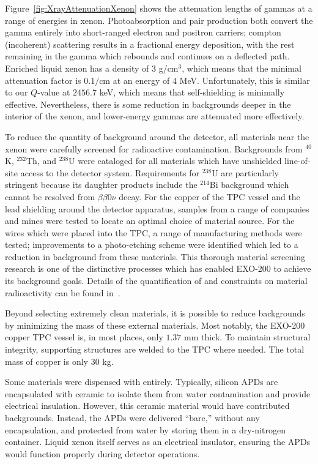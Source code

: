 Figure~\ref{fig:XrayAttenuationXenon} shows the attenuation lengths of gammas at a range of energies in xenon.  Photoabsorption and pair production both convert the gamma entirely into short-ranged electron and positron carriers; compton (incoherent) scattering results in a fractional energy deposition, with the rest remaining in the gamma which rebounds and continues on a deflected path.  Enriched liquid xenon has a density of $3$ g/cm$^3$, which means that the minimal attenuation factor is $0.1/\text{cm}$ at an energy of $4$ MeV.  Unfortunately, this is similar to our $Q$-value at $2456.7$ keV, which means that self-shielding is minimally effective.  Nevertheless, there is some reduction in backgrounds deeper in the interior of the xenon, and lower-energy gammas are attenuated more effectively.~\cite{XcomXenonAttenuation}

To reduce the quantity of background around the detector, all materials near the xenon were carefully screened for radioactive contamination.  Backgrounds from $^{40}$K, $^{232}$Th, and $^{238}$U were cataloged for all materials which have unshielded line-of-site access to the detector system.  Requirements for $^{238}$U are particularly stringent because its daughter products include the $^{214}$Bi background which cannot be resolved from $\beta\beta 0\nu$ decay.  For the copper of the TPC vessel and the lead shielding around the detector apparatus, samples from a range of companies and mines were tested to locate an optimal choice of material source.  For the wires which were placed into the TPC, a range of manufacturing methods were tested; improvements to a photo-etching scheme were identified which led to a reduction in background from these materials.  This thorough material screening research is one of the distinctive processes which has enabled EXO-200 to achieve its background goals.  Details of the quantification of and constraints on material radioactivity can be found in~\cite{MaterialsCatalog}.

Beyond selecting extremely clean materials, it is possible to reduce backgrounds by minimizing the mass of these external materials.  Most notably, the EXO-200 copper TPC vessel is, in most places, only $1.37$ mm thick. To maintain structural integrity, supporting structures are welded to the TPC where needed. The total mass of copper is only $30$ kg.~\cite{detectorPartI}

Some materials were dispensed with entirely.  Typically, silicon APDs are encapsulated with ceramic to isolate them from water contamination and provide electrical insulation.  However, this ceramic material would have contributed backgrounds.  Instead, the APDs were delivered ``bare,'' without any encapsulation, and protected from water by storing them in a dry-nitrogen container.  Liquid xenon itself serves as an electrical insulator, ensuring the APDs would function properly during detector operations.~\cite{EXOLAAPD}

